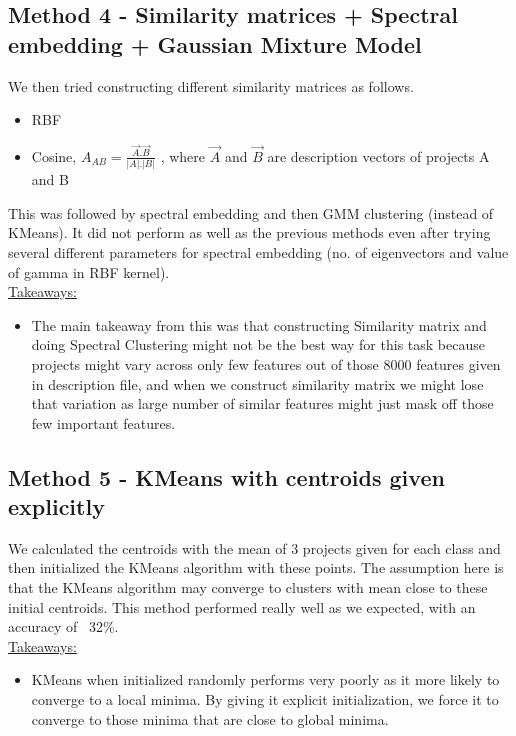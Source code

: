 \documentclass{article}
\begin{document}
\subsection*{Method 4 - Similarity matrices + Spectral embedding + Gaussian Mixture Model}
We then tried constructing different similarity matrices as follows. 
\begin{itemize}
\item RBF
\item Cosine, $A_{AB}= \frac{\vec{A} . \vec{B}}{|A| . |B|}$ , where $\vec{A}$ and $\vec{B}$ are description vectors of projects A and B
\end{itemize}

This was followed by spectral embedding and then GMM clustering (instead of KMeans). It did not perform as well as the previous methods even after trying several different parameters for spectral embedding (no. of eigenvectors and value of gamma in RBF kernel). \\
\underline{Takeaways:}\\
\vspace{-0.5cm}
\begin{itemize}
\item The main takeaway from this was that constructing Similarity matrix and doing Spectral Clustering might not be the best way for this task because projects might vary across only few features out of those 8000 features given in description file, and when we construct similarity matrix we might lose that variation as large number of similar features might just mask off those few important features.
\end{itemize}

\subsection*{Method 5 - KMeans with centroids given explicitly}
We calculated the centroids with the mean of 3 projects given for each class and then initialized the KMeans algorithm with these points. The assumption here is that the KMeans algorithm may converge to clusters with mean close to these initial centroids. This method performed really well as we expected, with an accuracy of ~32\%.\\
\underline{Takeaways:}\\
\vspace{-0.5cm}
\begin{itemize}
\item KMeans when initialized randomly performs very poorly as it more likely to converge to a local minima. By giving it explicit initialization, we force it to converge to those minima that are close to global minima.
\end{itemize}
\end{document}
